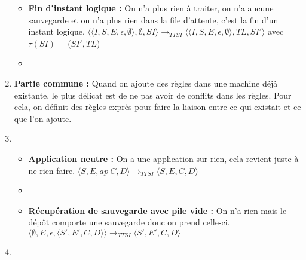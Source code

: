 \documentclass[10pt,a4paper]{report}
\begin{document}
\begin{enumerate}
\begin{itemize}
			\item[] \textbf{Fin d'instant logique :} On n'a plus rien à traiter, on n'a aucune sauvegarde et on n'a plus rien dans la file d'attente, c'est la fin d'un instant logique.
			\smallbreak
			$\langle\langle I,S,E,\epsilon,\emptyset \rangle ,\emptyset,SI\rangle 
			\longrightarrow_{TTSI} 
			\langle\langle I,S,E,\epsilon,\emptyset\rangle,TL,SI'\rangle$
			avec $\tau(SI)$ = ($SI',TL$) 
			\item[]
			
		\end{itemize}
		\item[] \textbf{Partie commune :} Quand on ajoute des règles dans une machine déjà existante, le plus délicat est de ne pas avoir de conflits dans les règles. Pour cela, on définit des règles exprès pour faire la liaison entre ce qui existait et ce que l'on ajoute. 
		\item[]
		\begin{itemize}
			\item[] \textbf{Application neutre :} On a une application sur rien, cela revient juste à ne rien faire.
			\smallbreak 
			$\langle S,E,ap~C,D\rangle
			\longrightarrow_{TTSI} 
			\langle S,E,C,D\rangle$
			\item[]
			\item[] \textbf{Récupération de sauvegarde avec pile vide :}  On n'a rien mais le dépôt comporte une sauvegarde donc on prend celle-ci.
			\smallbreak  
			$\langle \emptyset,E,\epsilon,\langle S',E',C,D\rangle\rangle
			\longrightarrow_{TTSI} 
			\langle S',E',C,D\rangle$
		\end{itemize}
		
		\item[]
	\end{enumerate}
	\bigbreak
	\bigbreak
	
\end{document}
